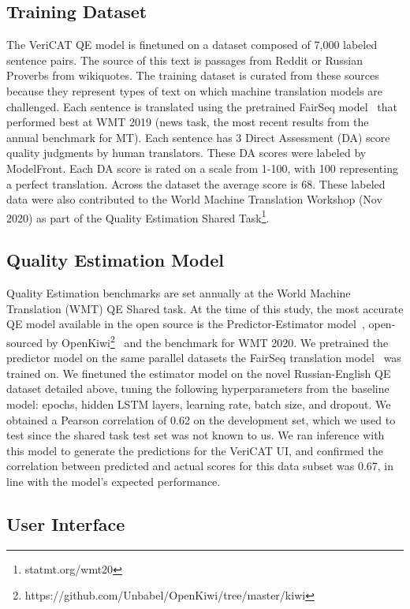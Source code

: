 \subsection{Training Dataset}
The VeriCAT QE model is finetuned on a dataset composed of 7,000 labeled sentence pairs. The source of this text is passages from Reddit or Russian Proverbs from wikiquotes. The training dataset is curated from these sources because they represent types of text on which machine translation models are challenged. Each sentence is translated using the pretrained FairSeq model~\cite{ott-etal-2019-fairseq} that performed best at WMT 2019 (news task, the most recent results from the annual benchmark for MT). Each sentence has 3 Direct Assessment (DA) score quality judgments by human translators. These DA scores were labeled by ModelFront. Each DA score is rated on a scale from 1-100, with 100 representing a perfect translation. Across the dataset the average score is 68. These labeled data were also contributed to the World Machine Translation Workshop (Nov 2020) as part of the Quality Estimation Shared Task\footnote{statmt.org/wmt20}.  


\subsection{Quality Estimation Model}
Quality Estimation benchmarks are set annually at the World Machine Translation (WMT) QE Shared task. At the time of this study, the most accurate QE model available in the open source is the Predictor-Estimator model~\cite{Kim2017PredictorEstimatorUM}, open-sourced by OpenKiwi\footnote{https://github.com/Unbabel/OpenKiwi/tree/master/kiwi}~\cite{UnBabel} and the benchmark for WMT 2020. We pretrained the predictor model on the same parallel datasets the FairSeq translation model~\cite{ott-etal-2019-fairseq} was trained on. We finetuned the estimator model on the novel Russian-English QE dataset detailed above, tuning the following hyperparameters from the baseline model: epochs, hidden LSTM layers, learning rate, batch size, and dropout. We obtained a Pearson correlation of 0.62 on the development set, which we used to test since the shared task test set was not known to us. We ran inference with this model to generate the predictions for the VeriCAT UI, and confirmed the correlation between predicted and actual scores for this data subset was 0.67, in line with the model's expected performance. 


\subsection{User Interface}

